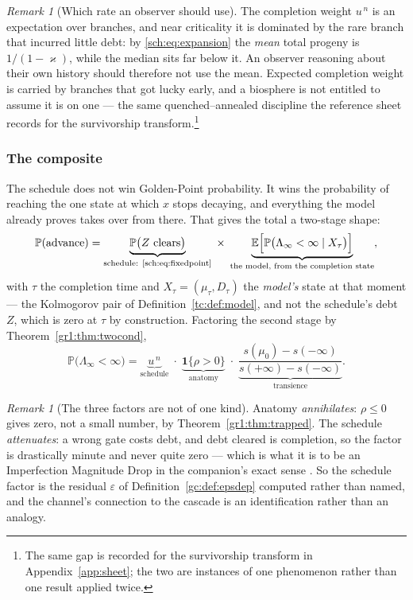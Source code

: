 \documentclass[11pt]{article}
\numberwithin{equation}{section}
\theoremstyle{plain}
\theoremstyle{definition}
\theoremstyle{remark}
\newtheorem{remark}[theorem]{Remark}
\newcommand{\E}{\mathbb{E}}
\newcommand{\PP}{\mathbb{P}}
\newcommand{\one}{\mathbf{1}}
\begin{document}
\begin{remark}[Which rate an observer should use]\label{sch:rem:gap2}
The completion weight $u^{\,n}$ is an expectation over branches, and
near criticality it is dominated by the rare branch that incurred little
debt: by \eqref{sch:eq:expansion} the \emph{mean} total progeny is
$1/(1-\varkappa)$, while the median sits far below it. An observer reasoning
about their own history should therefore not use the mean. Expected
completion weight is carried by branches that got lucky early, and a
biosphere is not entitled to assume it is on one --- the same
quenched--annealed discipline the reference sheet records for the
survivorship transform.\footnote{The same gap is recorded for the survivorship transform in Appendix~\ref{app:sheet}; the two are instances of one phenomenon rather than one result applied twice.}
\end{remark}

\subsubsection{The composite}\label{sch:subsub:composite}

The schedule does not win Golden-Point probability. It wins the
probability of reaching the one state at which $x$ stops decaying, and
everything the model already proves takes over from there. That gives
the total a two-stage shape:
\begin{equation}\label{sch:eq:composite}
\PP(\text{advance})
=\underbrace{\PP\bigl(Z\ \text{clears}\bigr)}_{\text{schedule:
\eqref{sch:eq:fixedpoint}}}
\;\times\;
\underbrace{\E\Bigl[\PP\bigl(\Lambda_\infty<\infty\mid X_{\tau}\bigr)
\Bigr]}_{\text{the model, from the completion state}},
\end{equation}
with $\tau$ the completion time and $X_\tau=(\mu_\tau,D_\tau)$ the
\emph{model's} state at that moment --- the Kolmogorov pair of
Definition~\ref{tc:def:model}, and not the schedule's debt $Z$, which is
zero at $\tau$ by construction. Factoring the second stage by
Theorem~\ref{gr1:thm:twocond},
\begin{equation}\label{sch:eq:threecond}
\PP\bigl(\Lambda_\infty<\infty\bigr)
=\underbrace{u^{\,n}}_{\text{schedule}}
\;\cdot\;\underbrace{\one\{\rho>0\}}_{\text{anatomy}}
\;\cdot\;\underbrace{\frac{s(\mu_0)-s(-\infty)}{s(+\infty)-s(-\infty)}}
_{\text{transience}} .
\end{equation}

\begin{remark}[The three factors are not of one kind]
\label{sch:rem:threefactor}
Anatomy \emph{annihilates}: $\rho\le0$ gives zero, not a small number,
by Theorem~\ref{gr1:thm:trapped}. The schedule \emph{attenuates}: a
wrong gate costs debt, and debt cleared is completion, so the factor is
drastically minute and never quite zero --- which is what it is to be an
Imperfection Magnitude Drop in the companion's exact sense \cite{Nexus}.
So the schedule factor is the residual $\varepsilon$ of
Definition~\ref{gc:def:epsdep} computed rather than named, and the
channel's connection to the cascade is an identification rather than an
analogy.
\end{remark}
\end{document}
